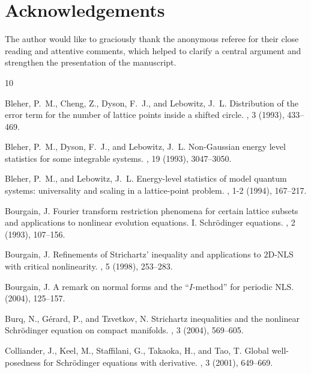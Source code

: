 \documentclass[12pt, letterpaper]{amsart}
\begin{document}
\section*{Acknowledgements}
The author would like to graciously thank the anonymous referee for their close reading and attentive comments, which helped to clarify a central argument and strengthen the presentation of the manuscript.

\begin{thebibliography}{10}

    {\sc Bleher, P.~M., Cheng, Z., Dyson, F.~J., and Lebowitz, J.~L.}
    \newblock Distribution of the error term for the number of lattice points
      inside a shifted circle.
    , 3 (1993), 433--469.
    
    {\sc Bleher, P.~M., Dyson, F.~J., and Lebowitz, J.~L.}
    \newblock Non-{G}aussian energy level statistics for some integrable systems.
    , 19 (1993), 3047--3050.
    
    {\sc Bleher, P.~M., and Lebowitz, J.~L.}
    \newblock Energy-level statistics of model quantum systems: universality and
      scaling in a lattice-point problem.
    , 1-2 (1994), 167--217.
    
    {\sc Bourgain, J.}
    \newblock Fourier transform restriction phenomena for certain lattice subsets
      and applications to nonlinear evolution equations. {I}. {S}chr\"{o}dinger
      equations.
    , 2 (1993), 107--156.
    
    {\sc Bourgain, J.}
    \newblock Refinements of {S}trichartz' inequality and applications to
      {$2$}{D}-{NLS} with critical nonlinearity.
    , 5 (1998), 253--283.
    
    {\sc Bourgain, J.}
    \newblock A remark on normal forms and the ``{$I$}-method'' for periodic {NLS}.
     (2004), 125--157.
    
    {\sc Burq, N., G\'{e}rard, P., and Tzvetkov, N.}
    \newblock Strichartz inequalities and the nonlinear {S}chr\"{o}dinger equation
      on compact manifolds.
    , 3 (2004), 569--605.
    
    {\sc Colliander, J., Keel, M., Staffilani, G., Takaoka, H., and Tao, T.}
    \newblock Global well-posedness for {S}chr\"{o}dinger equations with
      derivative.
    , 3 (2001), 649--669.
    

\end{thebibliography}
\end{document}
